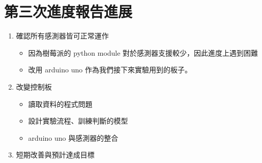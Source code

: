 \section{第三次進度報告進展}
\begin{enumerate}
	\item 確認所有感測器皆可正常運作 \begin{itemize}
		\item 因為樹莓派的 python module 對於感測器支援較少，因此進度上遇到困難
		\item 改用 arduino uno 作為我們接下來實驗用到的板子。
	\end{itemize}
	\item 改變控制板 \begin{itemize}
		\item 讀取資料的程式問題
		\item 設計實驗流程、訓練判斷的模型
		\item arduino uno 與感測器的整合
	\end{itemize}
	\item 短期改善與預計達成目標
\end{enumerate}